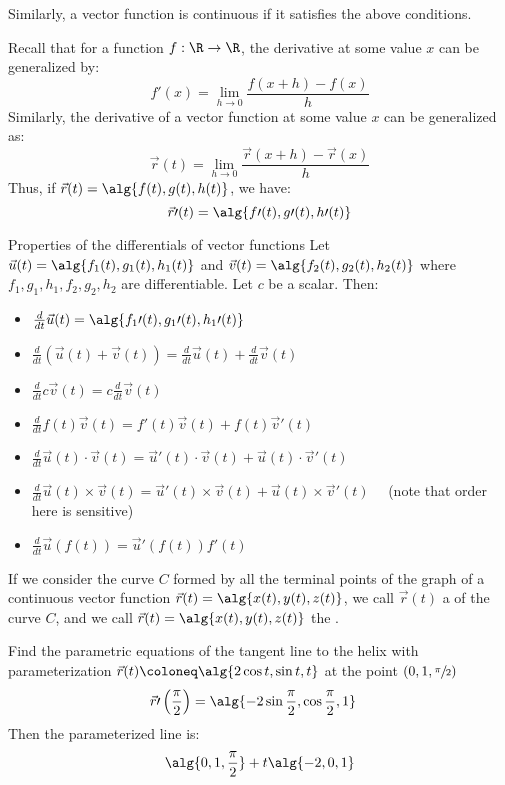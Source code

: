Similarly, a vector function is continuous if it satisfies the above conditions.

Recall that for a function $f : \R \to \R$, the derivative at some value $x$ can be generalized by:
\[ f\prime(x) = \lim_{h \to 0} \frac{f(x + h) - f(x)}{h} \]
Similarly, the derivative of a vector function at some value $x$ can be generalized as:
\[ \vec{r}(t) = \lim_{h \to 0} \frac{\vec{r}(x+h) - \vec{r}(x)}{h} \]
Thus, if $\vec{r}(t) = \alg{f(t), g(t), h(t)}$, we have:
\[ \vec{r}\prime(t) = \alg{f\prime(t), g\prime(t), h\prime(t)} \]

\begin{thmbox}{Properties of the differentials of vector functions}{}
    Let $\vec{u}(t) = \alg{f_1(t), g_1(t), h_1(t)}$ and $\vec{v}(t) = \alg{f_2(t), g_2(t), h_2(t) }$ where $f_1, g_1, h_1, f_2, g_2, h_2$ are differentiable. Let $c$ be a scalar. Then:
    \begin{itemize}
        \item $\frac{d}{dt} \vec{u}(t) = \alg{f_1\prime(t), g_1\prime(t), h_1\prime(t)}$
        \item $\frac{d}{dt} \left( \vec{u}(t) + \vec{v}(t) \right) = \frac{d}{dt} \vec{u}(t) + \frac{d}{dt} \vec{v}(t)$
        \item $\frac{d}{dt} c \vec{v}(t) = c \frac{d}{dt} \vec{v}(t)$
        \item $\frac{d}{dt} f(t) \vec{v}(t) = f\prime(t) \vec{v}(t) + f(t) \vec{v}\prime(t)$
        \item $\frac{d}{dt} \vec{u}(t) \cdot \vec{v}(t) = \vec{u}\prime(t) \cdot \vec{v}(t) + \vec{u}(t) \cdot \vec{v}\prime(t)$
        \item $\frac{d}{dt} \vec{u}(t) \times \vec{v}(t) = \vec{u}\prime(t) \times \vec{v}(t) + \vec{u}(t) \times \vec{v}\prime(t) \quad$ (note that order here is sensitive)
        \item $\frac{d}{dt} \vec{u}(f(t)) = \vec{u}\prime(f(t)) f\prime(t)$
    \end{itemize}
\end{thmbox}

If we consider the curve $C$ formed by all the terminal points of the graph of a continuous vector function $\vec{r}(t) = \alg{x(t), y(t), z(t)}$, we call $\vec{r}(t)$ a  of the curve $C$, and we call $\vec{r}(t) = \alg{x(t), y(t), z(t)}$ the .

\begin{exbox}{}{}
    Find the parametric equations of the tangent line to the helix with parameterization $\vec{r}(t) \coloneq \alg{2 \cos t, \sin t, t}$ at the point $(0,1,\sfrac{\pi}{2})$
    \tcblower
    \begin{align*}
        \vec{r}\prime \left( \frac{\pi}{2} \right)
        &= \alg{-2 \sin \frac{\pi}{2}, \cos \frac{\pi}{2}, 1}
    \end{align*}
    Then the parameterized line is:
    \[ \alg{0,1,\frac{\pi}{2}} + t\alg{-2,0,1} \]
\end{exbox}

